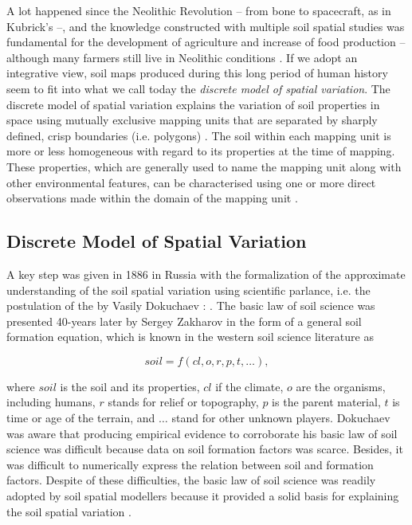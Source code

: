 A lot happened since the Neolithic Revolution \cite{BrevikEtAl2010} -- from bone to spacecraft, as in 
Kubrick's \footKubrick{} --, and the knowledge constructed with multiple soil spatial studies was fundamental 
for the development of agriculture and increase of food production -- although many farmers still live in 
Neolithic conditions \cite{MazoyerEtAl2008}. If we adopt an integrative view, soil maps produced during this 
long period of human history seem to fit into what we call today the \emph{discrete model of spatial 
variation}. The discrete model of spatial variation explains the variation of soil properties in space 
using mutually exclusive mapping units that are separated by sharply defined, crisp boundaries (i.e. polygons) 
\cite{Heuvelink1996, Legros2006}. The soil\footsoil{} within each mapping unit is more or less homogeneous 
with regard to its properties at the time of mapping. These properties, which are generally used to name the 
mapping unit along with other environmental features, can be characterised using one or more direct 
observations made within the domain of the mapping unit \cite{WebsterEtAl1990, Rossiter2000, 
Legros2006}.

\subsection{Discrete Model of Spatial Variation}
\label{sec:chap02-discrete}

A key step was given in 1886 in Russia with the formalization of the approximate understanding of the soil 
spatial variation using scientific parlance, i.e. the postulation of the  by 
Vasily Dokuchaev \cite{Florinsky2012}: . The basic law of soil science was presented 40-years later by Sergey Zakharov in the form of a 
general soil formation equation, which is known in the western soil science literature as \cite{Jenny1941, 
Florinsky2012}

\begin{equation}\label{eqn:chap02-clorpt}
 soil = f(cl, o, r, p, t, \ldots),
\end{equation}

\noindent where $soil$ is the soil and its properties, $cl$ if the climate, $o$ are the organisms, including 
humans, $r$ stands for relief or topography, $p$ is the parent material, $t$ is time or age of the terrain, 
and $\ldots$ stand for other unknown players. Dokuchaev was aware that producing empirical evidence to 
corroborate his basic law of soil science was difficult because data on soil formation factors was scarce. 
Besides, it was difficult to numerically express the relation between soil and formation factors. Despite of 
these difficulties, the basic law of soil science was readily adopted by soil spatial modellers because it 
provided a solid basis for explaining the soil spatial variation \cite{Smith1986}.

